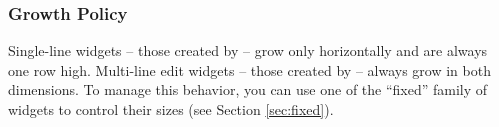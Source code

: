 \subsubsection{Growth Policy}

Single-line  widgets -- those created by  --
grow only horizontally and are always one row high.  Multi-line edit
widgets -- those created by  -- always
grow in both dimensions.  To manage this behavior, you can use one of
the ``fixed'' family of widgets to control their sizes (see Section
\ref{sec:fixed}).
